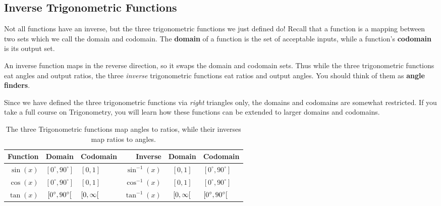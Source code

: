 \newpage

\subsection{Inverse Trigonometric Functions}%
\label{sub:inverse-trigonometric-functions}

Not all functions have an inverse, but the three trigonometric
functions we just defined do! Recall that a function is a mapping
between two sets which we call the domain and codomain. The
\textbf{domain} of a function is the set of acceptable inputs, while a
function's \textbf{codomain} is its output set.

An inverse function maps in the reverse direction, so it swaps the
domain and codomain sets. Thus while the three trigonometric functions
eat angles and output ratios, the three \emph{inverse} trigonometric
functions eat ratios and output angles. You should think of them as
\textbf{angle finders}.

Since we have defined the three trigonometric functions via
\emph{right} triangles only, the domains and codomains are somewhat
restricted. If you take a full course on Trigonometry, you will learn
how these functions can be extended to larger domains and codomains.

\begin{table}[h]
  \centering
  \begin{tabular}{r@{ : }c@{ \(\mapsto\) }lr@{ : }c@{ \(\mapsto\) }l}
    \toprule
    Function
    & Domain
    & Codomain
    & Inverse
    & Domain
    & Codomain \\
    \midrule
    \(\sin(x)\)
    & \([0^{\circ}, 90^{\circ}]\)
    & \([0,1]\)
    & \(\sin^{-1}(x)\)
    & \([0,1]\)
    & \([0^{\circ}, 90^{\circ}]\) \\
    \(\cos(x)\)
    & \([0^{\circ}, 90^{\circ}]\)
    & \([0,1]\)
    & \(\cos^{-1}(x)\)
    & \([0,1]\)
    & \([0^{\circ}, 90^{\circ}]\) \\
    \(\tan(x)\)
    & \( \interval[open right]{0^{\circ}}{90^{\circ}} \)
    & \( \interval[open right]{0}{\infty} \)
    & \(\tan^{-1}(x)\)
    & \( \interval[open right]{0}{\infty} \)
    & \( \interval[open right]{0^{\circ}}{90^{\circ}} \) \\
    \bottomrule
  \end{tabular}
  \caption{The three Trigonometric functions map angles to ratios,
    while their inverses map ratios to angles.}%
  \label{tab:domain-range-trig-funcs}
\end{table}

